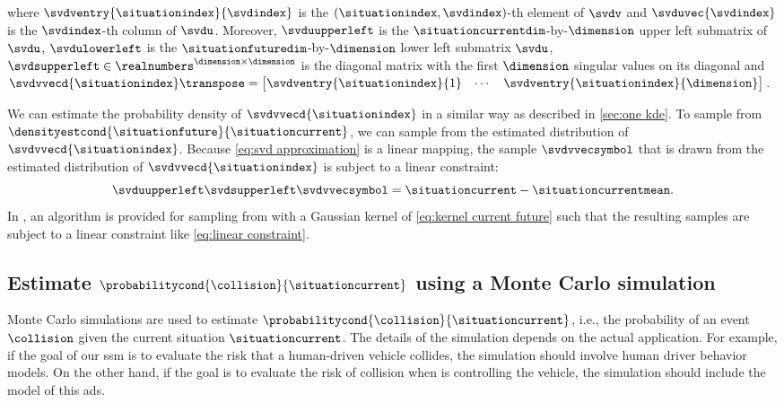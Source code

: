 where $\svdventry{\situationindex}{\svdindex}$ is the $(\situationindex,\svdindex)$-th element of $\svdv$ and $\svduvec{\svdindex}$ is the $\svdindex$-th column of $\svdu$.
Moreover, $\svduupperleft$ is the $\situationcurrentdim$-by-$\dimension$ upper left submatrix of $\svdu$, $\svdulowerleft$ is the $\situationfuturedim$-by-$\dimension$ lower left submatrix $\svdu$, $\svdsupperleft\in\realnumbers^{\dimension\times\dimension}$ is the diagonal matrix with the first $\dimension$ singular values on its diagonal and $\svdvvecd{\situationindex}\transpose = \begin{bmatrix} \svdventry{\situationindex}{1} & \cdots & \svdventry{\situationindex}{\dimension}	\end{bmatrix}$.

We can estimate the probability density of $\svdvvecd{\situationindex}$ in a similar way as described in \cref{sec:one kde}.
To sample from $\densityestcond{\situationfuture}{\situationcurrent}$, we can sample from the estimated distribution of $\svdvvecd{\situationindex}$.
Because \cref{eq:svd approximation} is a linear mapping, the sample $\svdvvecsymbol$ that is drawn from the estimated distribution of $\svdvvecd{\situationindex}$ is subject to a linear constraint:
\begin{equation}
	\label{eq:linear constraint}
	\svduupperleft \svdsupperleft \svdvvecsymbol = \situationcurrent - \situationcurrentmean.
\end{equation}
In \autocite{degelder2021conditional}, an algorithm is provided for sampling from  with a Gaussian kernel of \cref{eq:kernel current future} such that the resulting samples are subject to a linear constraint like \cref{eq:linear constraint}.



\subsection{Estimate $\probabilitycond{\collision}{\situationcurrent}$ using a Monte Carlo simulation}
\label{sec:estimate collision}

\cstarta Monte Carlo simulations are used to estimate $\probabilitycond{\collision}{\situationcurrent}$, i.e., the probability of an event $\collision$ given the current situation $\situationcurrent$. \cenda
The details of the simulation depends on the actual application. 
For example, if the goal of our \ac{ssm} is to evaluate the risk that a human-driven vehicle collides, the simulation should involve human driver behavior models. 
On the other hand, if the goal is to evaluate the risk of collision when  is controlling the vehicle, the simulation should include the model of this \ac{ads}.

